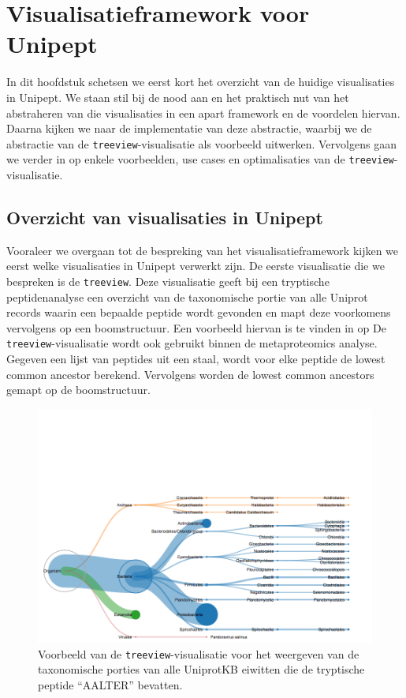 \chapter{Visualisatieframework voor Unipept} 
\label{chap:vis}

In dit hoofdstuk schetsen we eerst kort het overzicht van de huidige
visualisaties in Unipept. We staan stil bij de nood aan en het praktisch nut van
het abstraheren van die visualisaties in een apart framework en de voordelen
hiervan. Daarna kijken we naar de implementatie van deze abstractie, waarbij we
de abstractie van de \texttt{treeview}-visualisatie als voorbeeld uitwerken.
Vervolgens gaan we verder in op enkele voorbeelden, use cases en optimalisaties
van de \texttt{treeview}-visualisatie.

\section{Overzicht van visualisaties in Unipept}

\label{sec:unipeptvis} 

Vooraleer we overgaan tot de bespreking van het visualisatieframework kijken we
eerst welke visualisaties in Unipept verwerkt zijn. De eerste visualisatie die
we bespreken is de \texttt{treeview}. Deze visualisatie geeft bij een tryptische
peptidenanalyse een overzicht van de taxonomische portie van alle Uniprot
records waarin een bepaalde peptide wordt gevonden en mapt deze voorkomens
vervolgens op een boomstructuur. Een voorbeeld hiervan is te vinden in
 op  De
\texttt{treeview}-visualisatie wordt ook gebruikt binnen de metaproteomics
analyse. Gegeven een lijst van peptides uit een staal, wordt voor elke peptide
de lowest common ancestor berekend. Vervolgens worden de lowest common ancestors
gemapt op de boomstructuur.

\begin{figure}
    \centering
    \includegraphics[width=1\textwidth]{includes/visoverzicht1}
    \caption{Voorbeeld van de \texttt{treeview}-visualisatie voor het weergeven 
    van de taxonomische porties van alle UniprotKB eiwitten die de tryptische 
    peptide ``AALTER'' bevatten.}
    \label{fig:overzicht1}
\end{figure}

